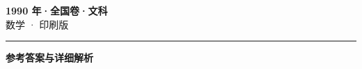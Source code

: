 \documentclass[zihao=5, a4paper]{ctexart}
\begin{document}
\begin{center}
  {\Large\bfseries 1990 年·全国卷·文科}\\[4pt]
  {\large 数学 · 印刷版}
\end{center}
\medskip
{}

\par\bigskip\hrule\bigskip
{}
\begin{center}{\large\bfseries 参考答案与详细解析}\end{center}
\smallskip

\end{document}

